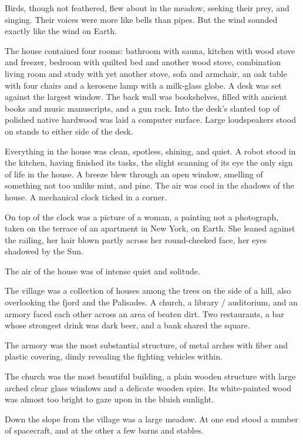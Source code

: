 \documentclass[english,11pt,letterpaper,onecolumn]{scrbook}
\begin{document}
	Birds, though not feathered, flew about in the meadow, seeking their prey, and singing. Their voices were more like bells than pipes. But the wind sounded exactly like the wind on Earth.

	The house contained four rooms: bathroom with sauna, kitchen with wood stove and freezer, bedroom with quilted bed and another wood stove, combination living room and study with yet another stove, sofa and armchair, an oak table with four chairs and a kerosene lamp with a milk-glass globe. A desk was set against the largest window. The back wall was bookshelves, filled with ancient books and music manuscripts, and a gun rack. Into the desk's slanted top of polished native hardwood was laid a computer surface. Large loudspeakers stood on stands to either side of the desk. 

	Everything in the house was clean, spotless, shining, and quiet. A robot stood in the kitchen, having finished its tasks, the slight scanning of its eye the only sign of life in the house. A breeze blew through an open window, smelling of something not too unlike mint, and pine.  The air was cool in the shadows of the house. A mechanical clock ticked in a corner. 

	On top of the clock was a picture of a woman, a painting not a photograph, taken on the terrace of an apartment in New York, on Earth. She leaned against the railing, her hair blown partly across her round-cheeked face, her eyes shadowed by the Sun.

	The air of the house was of intense quiet and solitude.

	The village was a collection of houses among the trees on the side of a hill, also overlooking the fjord and the Palisades. A church, a library / auditorium, and an armory faced each other across an area of beaten dirt. Two restaurants, a bar whose strongest drink was dark beer, and a bank shared the square. 

	The armory was the most substantial structure, of metal arches with fiber and plastic covering, dimly revealing the fighting vehicles within. 

	The church was the most beautiful building, a plain wooden structure with large arched clear glass windows and a delicate wooden spire. Its white-painted wood was almost too bright to gaze upon in the bluish sunlight. 

	Down the slope from the village was a large meadow. At one end stood a number of spacecraft, and at the other a few barns and stables.
\end{document}
